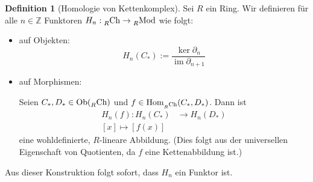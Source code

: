 \documentclass[a4paper,twoside,10pt]{scrreprt}
\DeclareMathOperator{\img}{im}
\newcommand{\Z}{\mathbb{Z}}
\theoremstyle{definition}
\newtheorem{definition}[satz]{Definition}
\begin{document}
\begin{definition}[Homologie von Kettenkomplex]
Sei $R$ ein Ring. Wir definieren für alle $n\in \Z$ Funktoren $H_n:\prescript{}{R}{\text{Ch}}\to \prescript{}{R}{\text{Mod}}$ wie folgt:
\begin{itemize}
\item auf Objekten:
\begin{equation*}
H_n(C_*):=\frac{\ker\partial_n}{\img\partial_{n+1}}
\end{equation*}
\item auf Morphismen:\par
Seien $C_*,D_*\in \text{Ob}(\prescript{}{R}{\text{Ch}})$ und $f\in \text{Hom}_{\prescript{}{R}{\text{Ch}}}(C_*,D_*)$. Dann ist 
\begin{align*}
H_n(f):H_n(C_*)&\to H_n(D_*)\\
[x]\mapsto [f(x)]
\end{align*}
eine wohldefinierte, $R$-lineare Abbildung. (Dies folgt aus der universellen Eigenschaft von Quotienten, da $f$ eine Kettenabbildung ist.)
\end{itemize}
Aus dieser Konstruktion folgt sofort, dass $H_n$ ein Funktor ist.
\end{definition}
\end{document}
